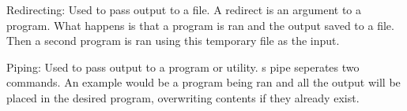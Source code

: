 \documentclass[letterpaper,10pt,titlepage]{article}
\begin{document}
Redirecting: Used to pass output to a file. A redirect is an argument to a program.  What happens is that a program is ran and the output saved to a file. Then a second program  is ran using this temporary file as the input.

Piping: Used to pass output to a program or utility. s pipe seperates two commands.  An example would be a program being ran and all the output will be placed in the desired program, overwriting contents if they already exist.
\end{document}
